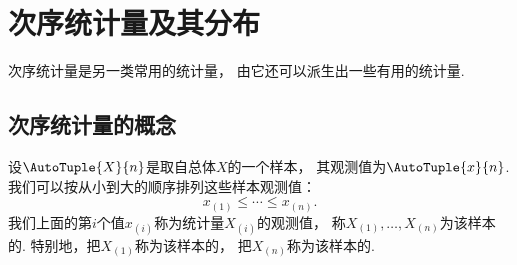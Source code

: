 \section{次序统计量及其分布}
次序统计量是另一类常用的统计量，
由它还可以派生出一些有用的统计量.

\subsection{次序统计量的概念}
设\(\AutoTuple{X}{n}\)是取自总体\(X\)的一个样本，
其观测值为\(\AutoTuple{x}{n}\).
我们可以按从小到大的顺序排列这些样本观测值：\[
	x_{(1)} \leq \dotsb \leq x_{(n)}.
\]
我们上面的第\(i\)个值\(x_{(i)}\)称为统计量\(X_{(i)}\)的观测值，
称\(X_{(1)},\dotsc,X_{(n)}\)为该样本的.
特别地，把\(X_{(1)}\)称为该样本的，
把\(X_{(n)}\)称为该样本的.

